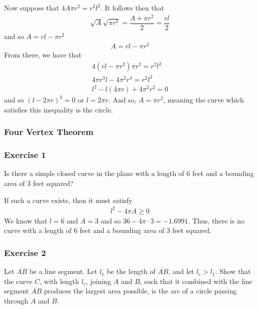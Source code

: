 \documentclass{article}
\begin{document}
	Now suppose that $4 A \pi r^2 = r^2 l^2$. It follows then that
	\begin{gather*}
		\sqrt{A} \sqrt{\pi r^2} = \dfrac{A + \pi r^2}{2} = \dfrac{rl}{2}
	\end{gather*}
	and so $A = rl - \pi r^2$
	\begin{gather*}
		A = rl - \pi r^2
	\end{gather*}
	From there, we have that
	\begin{gather*}
		4 \left( rl - \pi r^2 \right) \pi r^2 = r^2 l^2 \\
		4 \pi r^3 l - 4 \pi^2 r^4 = r^2 l^2 \\
		l^2 - l \left( 4 \pi r \right) + 4 \pi^2 r^2 = 0
	\end{gather*}
	and so $\left( l - 2 \pi r \right)^2 = 0$ or $l = 2 \pi r$. And so, $A = \pi r^2$, meaning the curve which satisfies this inequality is the circle.
	
	\subsubsection*{Four Vertex Theorem}
	








	\subsubsection*{Exercise 1}
	Is there a simple closed curve in the plane with a length of 6 feet and a bounding area of 3 feet squared?
	
	If such a curve exists, then it must satisfy
	\begin{gather*}
		l^2 - 4 \pi A \geq 0
	\end{gather*}
	We know that $l = 6$ and $A = 3$ and so $36 - 4 \pi \cdot 3 = -1.6991$. Thus, there is no curve with a length of 6 feet and a bounding area of 3 feet squared.

	\subsubsection*{Exercise 2}
	Let $\overline{AB}$ be a line segment. Let $l_1$ be the length of $\overline{AB}$,  and let $l_c > l_1$. Show that the curve $C$, with length $l_c$, joining $A$ and $B$, such that it combined with the line segment $\overline{AB}$ produces the largest area possible, is the arc of a circle passing through $A$ and $B$.
	
\end{document}
